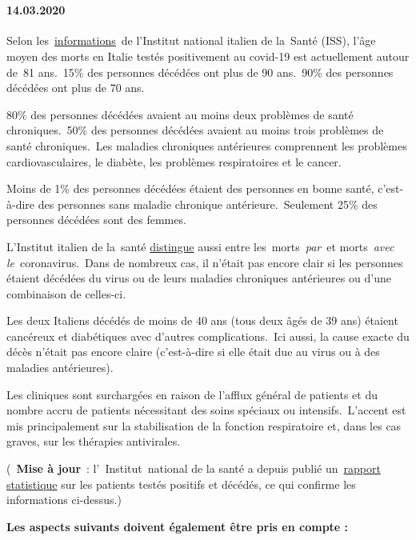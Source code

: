 ~

\hypertarget{14032020}{%
\paragraph{14.03.2020}\label{14032020}}

Selon
les~\href{https://www.youtube.com/channel/UC4fru33Tzpu0UhCIHChiNFA/videos}{informations}~de
l'Institut national italien de la~Santé (ISS), l'âge moyen des morts en
Italie testés positivement au covid-19 est actuellement autour de~81
ans.~15\% des personnes décédées ont plus de 90 ans.~90\% des personnes
décédées ont plus de 70 ans.

80\% des personnes décédées avaient au moins deux problèmes de santé
chroniques.~50\% des personnes décédées avaient au moins trois problèmes
de santé chroniques.~Les maladies chroniques antérieures comprennent les
problèmes cardiovasculaires, le diabète, les problèmes respiratoires et
le cancer.

Moins de 1\% des personnes décédées étaient des personnes en bonne
santé, c'est-à-dire des personnes sans maladie chronique
antérieure.~Seulement 25\% des personnes décédées sont des femmes.

L'Institut italien de la~santé
\href{https://youtu.be/0M4kbPDHGR0?t=210}{distingue} aussi entre
les~morts~\emph{par}~et morts~\emph{avec le}~coronavirus.~Dans de
nombreux cas, il n'était pas encore clair si les personnes étaient
décédées du virus ou de leurs maladies chroniques antérieures ou d'une
combinaison de celles-ci.

Les deux Italiens décédés de moins de 40 ans (tous deux âgés de 39 ans)
étaient cancéreux et diabétiques avec d'autres complications.~Ici aussi,
la cause exacte du décès n'était pas encore claire (c'est-à-dire si elle
était due au virus ou à des maladies antérieures).

Les cliniques sont surchargées en raison de l'afflux général de patients
et du nombre accru de patients nécessitant des soins spéciaux ou
intensifs.~L'accent est mis principalement sur la stabilisation de la
fonction respiratoire et, dans les cas graves, sur les thérapies
antivirales.

(~\textbf{Mise à jour}~: l'~Institut~national de la santé a depuis
publié
un~\href{https://www.epicentro.iss.it/coronavirus/bollettino/Report-COVID-2019_13_marzo.pdf}{rapport
statistique} sur les patients testés positifs et décédés, ce qui
confirme les informations ci-dessus.)

\textbf{Les aspects suivants doivent également être pris en compte :}


